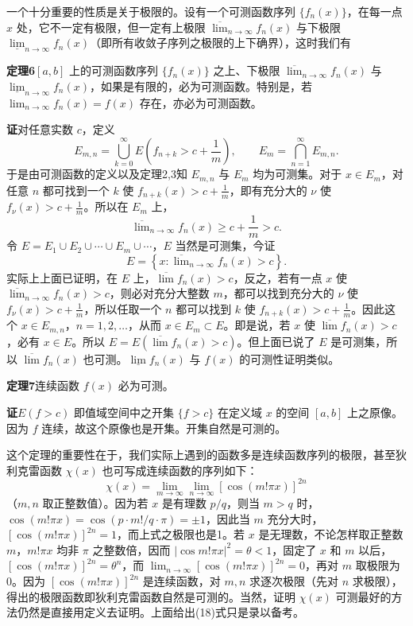 一个十分重要的性质是关于极限的。设有一个可测函数序列 $\{f_n(x)\}$，在每一点 $x$ 处，它不一定有极限，但一定有上极限 $\overline{\lim}_{n\to\infty}f_n(x)$ 与下极限 $\underline{\lim}_{n\to\infty}f_n(x)$（即所有收敛子序列之极限的上下确界），这时我们有

\begin{sloppypar}\noindent\textbf{定理6}\quad $[a,b]$ 上的可测函数序列 $\{f_n(x)\}$ 之上、下极限 $\overline{\lim}_{n\to\infty}f_n(x)$ 与 $\underline{\lim}_{n\to\infty}f_n(x)$，如果是有限的，必为可测函数。特别是，若 $\lim_{n\to\infty}f_n(x)=f(x)$ 存在，亦必为可测函数。\end{sloppypar}

\noindent\textbf{证}\quad 对任意实数 $c$，定义
\[
 E_{m,n}=\bigcup_{k=0}^{\infty}E\left(f_{n+k}>c+\frac1m\right),
 \qquad
 E_m=\bigcap_{n=1}^{\infty}E_{m,n}.
\]
于是由可测函数的定义以及定理2,3知 $E_{m,n}$ 与 $E_m$ 均为可测集。对于 $x\in E_m$，对任意 $n$ 都可找到一个 $k$ 使 $f_{n+k}(x)>c+\frac1m$，即有充分大的 $\nu$ 使 $f_\nu(x)>c+\frac1m$。所以在 $E_m$ 上，
\[
 \overline{\lim}_{n\to\infty}f_n(x)\ge c+\frac1m>c.
\]
令 $E=E_1\cup E_2\cup\cdots\cup E_m\cup\cdots$，$E$ 当然是可测集，今证
\[
 E=\left\{x:\overline{\lim}_{n\to\infty}f_n(x)>c\right\}.
\]
实际上上面已证明，在 $E$ 上，$\overline{\lim}f_n(x)>c$，反之，若有一点 $x$ 使 $\overline{\lim}_{n\to\infty}f_n(x)>c$，则必对充分大整数 $m$，都可以找到充分大的 $\nu$ 使 $f_\nu(x)>c+\frac1m$，所以任取一个 $n$ 都可以找到 $k$ 使 $f_{n+k}(x)>c+\frac1m$。因此这个 $x\in E_{m,n}$，$n=1,2,\ldots$，从而 $x\in E_m\subset E$。即是说，若 $x$ 使 $\overline{\lim}f_n(x)>c$，必有 $x\in E$。所以 $E=E(\overline{\lim}f_n(x)>c)$。但上面已说了 $E$ 是可测集，所以 $\overline{\lim}f_n(x)$ 也可测。$\underline{\lim}f_n(x)$ 与 $f(x)$ 的可测性证明类似。

\noindent\textbf{定理7}\quad 连续函数 $f(x)$ 必为可测。

\noindent\textbf{证}\quad $E(f>c)$ 即值域空间中之开集 $\{f>c\}$ 在定义域 $x$ 的空间 $[a,b]$ 上之原像。因为 $f$ 连续，故这个原像也是开集。开集自然是可测的。

这个定理的重要性在于，我们实际上遇到的函数多是连续函数序列的极限，甚至狄利克雷函数 $\chi(x)$ 也可写成连续函数的序列如下：
\begin{equation}
 \chi(x)=\lim_{m\to\infty}\lim_{n\to\infty}[\cos(m!\pi x)]^{2n}
 \tag{18}
\end{equation}
（$m,n$ 取正整数值）。因为若 $x$ 是有理数 $p/q$，则当 $m>q$ 时，$\cos(m!\pi x)=\cos(p\cdot m!/q\cdot\pi)=\pm1$，因此当 $m$ 充分大时，$[\cos(m!\pi x)]^{2n}=1$，而上式之极限也是1。若 $x$ 是无理数，不论怎样取正整数 $m$，$m!\pi x$ 均非 $\pi$ 之整数倍，因而 $|\cos m!\pi x|^2=\theta<1$，固定了 $x$ 和 $m$ 以后，$[\cos(m!\pi x)]^{2n}=\theta^n$，而 $\lim_{n\to\infty}[\cos(m!\pi x)]^{2n}=0$，再对 $m$ 取极限为0。因为 $[\cos(m!\pi x)]^{2n}$ 是连续函数，对 $m,n$ 求逐次极限（先对 $n$ 求极限），得出的极限函数即狄利克雷函数自然是可测的。当然，证明 $\chi(x)$ 可测最好的方法仍然是直接用定义去证明。上面给出(18)式只是录以备考。

